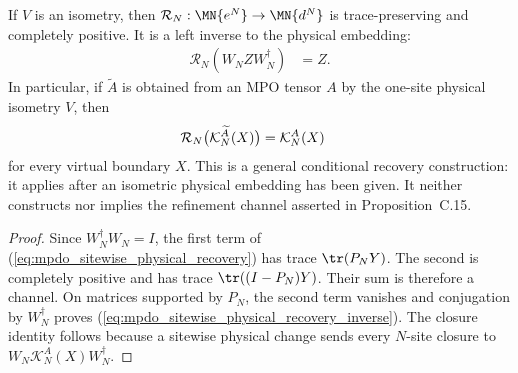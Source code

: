 \begin{lemma}
    \label{lem:mpdo_sitewise_physical_recovery}
    \leanok
    If $V$ is an isometry, then
    $\mathcal R_N:\MN{e^N}\to\MN{d^N}$ is trace-preserving and completely
    positive. It is a left inverse to the physical embedding:
    \begin{align}
        \mathcal R_N(W_NZW_N^\dagger) & =Z.
        \label{eq:mpdo_sitewise_physical_recovery_inverse}
    \end{align}
    In particular, if $\widetilde A$ is obtained from an MPO tensor $A$ by the
    one-site physical isometry $V$, then
    \begin{align}
        \mathcal R_N\bigl(\mathcal K_N^{\widetilde A}(X)\bigr)
         & =\mathcal K_N^A(X)
        \notag
    \end{align}
    for every virtual boundary $X$. This is a general conditional recovery
    construction: it applies after an isometric physical embedding has been
    given. It neither constructs nor implies the refinement channel asserted
    in Proposition~C.15.
\end{lemma}

\begin{proof}\leanok
    Since $W_N^\dagger W_N=I$, the first term of
    (\ref{eq:mpdo_sitewise_physical_recovery}) has trace
    $\tr(P_NY)$. The second is completely positive and has trace
    $\tr((I-P_N)Y)$. Their sum is therefore a channel. On matrices supported by
    $P_N$, the second term vanishes and conjugation by $W_N^\dagger$ proves
    (\ref{eq:mpdo_sitewise_physical_recovery_inverse}). The closure identity
    follows because a sitewise physical change sends every $N$-site closure to
    $W_N\mathcal K_N^A(X)W_N^\dagger$.
\end{proof}


